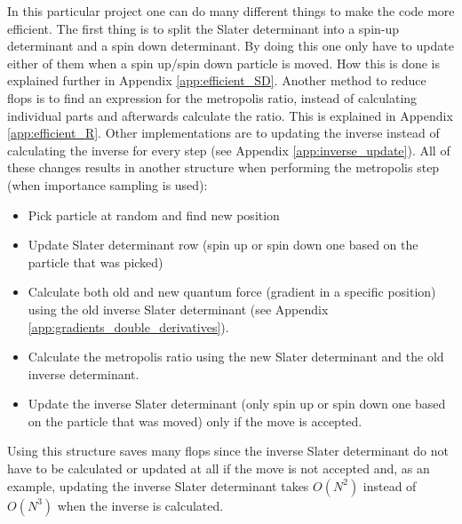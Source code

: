 In this particular project one can do many different things to make the code more efficient. The first thing is to split the Slater determinant into a spin-up determinant and a spin down determinant. By doing this one only have to update either of them when a spin up/spin down particle is moved. How this is done is explained further in Appendix \ref{app:efficient_SD}. Another method to reduce flops is to find an expression for the metropolis ratio, instead of calculating individual parts and afterwards calculate the ratio. This is explained in Appendix \ref{app:efficient_R}. Other implementations are to updating the inverse instead of calculating the inverse for every step (see Appendix \ref{app:inverse_update}). All of these changes results in another structure when performing the metropolis step (when importance sampling is used):
\begin{itemize}
\item Pick particle at random and find new position
\item Update Slater determinant row (spin up or spin down one based on the particle that was picked)
\item Calculate both old and new quantum force (gradient in a specific position) using the old inverse Slater determinant (see Appendix \ref{app:gradients_double_derivatives}).
\item Calculate the metropolis ratio using the new Slater determinant and the old inverse determinant.
\item Update the inverse Slater determinant (only spin up or spin down one based on the particle that was moved) only if the move is accepted. 
\end{itemize}
Using this structure saves many flops since the inverse Slater determinant do not have to be calculated or updated at all if the move is not accepted and, as an example, updating the inverse Slater determinant takes $O(N^2)$ instead of $O(N^3)$ when the inverse is calculated. 